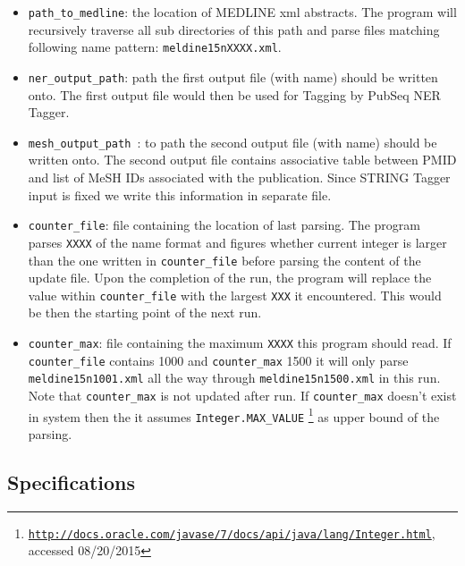 \begin{itemize}
\item \texttt{path\_to\_medline}: the location of MEDLINE xml abstracts. The program will recursively traverse all sub directories of this path and parse files matching following name pattern: \texttt{meldine15nXXXX.xml}.

\item \texttt{ner\_output\_path}: path the first output file (with name) should be written onto. The first output file would then be used for Tagging by PubSeq NER Tagger.

\item \texttt{mesh\_output\_path }: to path the second output file (with name) should be written onto. The second output file contains associative table between PMID and list of MeSH IDs associated with the publication. Since STRING Tagger input is fixed we write this information in separate file.

\item \texttt{counter\_file}: file containing the location of last parsing. The program parses \texttt{XXXX} of the name format and figures whether current integer is larger than the one written in \texttt{counter\_file} before parsing the content of the update file. Upon the completion of the run, the program will replace the value within \texttt{counter\_file} with the largest \texttt{XXX} it encountered. This would be then the starting point of the next run.

\item \texttt{counter\_max}: file containing the maximum \texttt{XXXX} this program should read. If \texttt{counter\_file} contains 1000 and \texttt{counter\_max} 1500 it will only parse \texttt{meldine15n1001.xml} all the way through \texttt{meldine15n1500.xml} in this run. Note that \texttt{counter\_max} is not updated after run. If \texttt{counter\_max} doesn't exist in system then the it assumes \texttt{Integer.MAX\_VALUE} \footnote{\href{http://docs.oracle.com/javase/7/docs/api/java/lang/Integer.html}{\texttt{http://docs.oracle.com/javase/7/docs/api/java/lang/Integer.html}}, accessed 08/20/2015} as upper bound of the parsing.
\end{itemize}

\subsection{Specifications}

